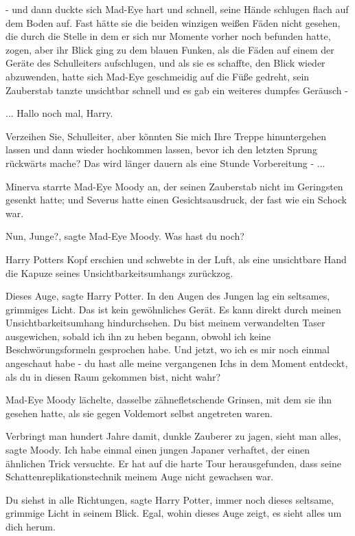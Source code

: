 - und dann duckte sich Mad-Eye hart und schnell, seine Hände schlugen flach auf
dem Boden auf. Fast hätte sie die beiden winzigen weißen Fäden nicht gesehen,
die durch die Stelle in dem er sich nur Momente vorher noch befunden hatte,
zogen, aber ihr Blick ging zu dem blauen Funken, als die Fäden auf einem der
Geräte des Schulleiters aufschlugen, und als sie es schaffte, den Blick wieder
abzuwenden, hatte sich Mad-Eye geschmeidig auf die Füße gedreht, sein Zauberstab
tanzte unsichtbar schnell und es gab ein weiteres dumpfes Geräusch -

... \glqq{}Hallo noch mal, Harry.\grqq{}

\glqq{}Verzeihen Sie, Schulleiter, aber könnten Sie mich Ihre Treppe
hinuntergehen lassen und dann wieder hochkommen lassen, bevor ich den letzten
Sprung rückwärts mache? Das wird länger dauern als eine Stunde Vorbereitung
-\grqq{} ...

Minerva starrte Mad-Eye Moody an, der seinen Zauberstab nicht im Geringsten
gesenkt hatte; und Severus hatte einen Gesichtsausdruck, der fast wie ein Schock
war.

\glqq{}Nun, Junge?\grqq{}, sagte Mad-Eye Moody. \glqq{}Was hast du noch?\grqq{}

Harry Potters Kopf erschien und schwebte in der Luft, als eine unsichtbare Hand
die Kapuze seines Unsichtbarkeitsumhangs zurückzog.

\glqq{}Dieses Auge\grqq{}, sagte Harry Potter. In den Augen des Jungen lag ein
seltsames, grimmiges Licht. \glqq{}Das ist kein gewöhnliches Gerät. Es kann
direkt durch meinen Unsichtbarkeitsumhang hindurchsehen. Du bist meinem
verwandelten Taser ausgewichen, sobald ich ihn zu heben begann, obwohl ich keine
Beschwörungsformeln gesprochen habe. Und jetzt, wo ich es mir noch einmal
angeschaut habe - du hast alle meine vergangenen Ichs in dem Moment entdeckt,
als du in diesen Raum gekommen bist, nicht wahr?\grqq{}

Mad-Eye Moody lächelte, dasselbe zähnefletschende Grinsen, mit dem sie ihn
gesehen hatte, als sie gegen Voldemort selbst angetreten waren.

\glqq{}Verbringt man hundert Jahre damit, dunkle Zauberer zu jagen, sieht man
alles\grqq{}, sagte Moody. \glqq{}Ich habe einmal einen jungen Japaner verhaftet,
der einen ähnlichen Trick versuchte. Er hat auf die harte Tour herausgefunden,
dass seine Schattenreplikationstechnik meinem Auge nicht gewachsen war.\grqq{}

\glqq{}Du siehst in alle Richtungen\grqq{}, sagte Harry Potter, immer noch dieses
seltsame, grimmige Licht in seinem Blick. \glqq{}Egal, wohin dieses Auge zeigt,
es sieht alles um dich herum.\grqq{}

